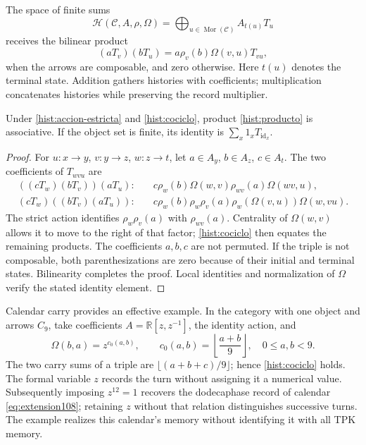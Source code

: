 The space of finite sums
\[
 \mathcal H(\mathcal C,A,\rho,\Omega)
   =\bigoplus_{u\in\operatorname{Mor}(\mathcal C)} A_{t(u)}T_u
\]
receives the bilinear product
\begin{equation}
 (aT_v)(bT_u)=a\rho_v(b)\Omega(v,u)T_{vu},
 \label{hist:producto}
\end{equation}
when the arrows are composable, and zero otherwise. Here \(t(u)\)
denotes the terminal state. Addition gathers histories with coefficients;
multiplication concatenates histories while preserving the record multiplier.

\begin{proposition}
Under \eqref{hist:accion-estricta} and \eqref{hist:cociclo}, product
\eqref{hist:producto} is associative. If the object set is finite,
its identity is \(\sum_x1_xT_{\operatorname{id}_x}\).
\end{proposition}
\begin{proof}
For \(u:x\to y\), \(v:y\to z\), \(w:z\to t\), let
\(a\in A_y\), \(b\in A_z\), \(c\in A_t\). The two coefficients
of \(T_{wvu}\) are
\begin{align*}
 ((cT_w)(bT_v))(aT_u):\quad&
 c\rho_w(b)\Omega(w,v)\rho_{wv}(a)\Omega(wv,u),\\
 (cT_w)((bT_v)(aT_u)):\quad&
 c\rho_w(b)\rho_w\rho_v(a)\rho_w(\Omega(v,u))\Omega(w,vu).
\end{align*}
The strict action identifies \(\rho_w\rho_v(a)\) with \(\rho_{wv}(a)\).
Centrality of \(\Omega(w,v)\) allows it to move to the right of
that factor; \eqref{hist:cociclo} then equates the remaining products.
The coefficients \(a,b,c\) are not permuted. If the triple is not
composable, both parenthesizations are zero because of their initial
and terminal states. Bilinearity completes the proof. Local identities
and normalization of \(\Omega\) verify the stated identity element.
\end{proof}

Calendar carry provides an effective example. In the category with one
object and arrows \(C_9\), take coefficients
\(A=\mathbb R[z,z^{-1}]\), the identity action, and
\[
 \Omega(b,a)=z^{c_0(a,b)},\qquad
 c_0(a,b)=\left\lfloor\frac{a+b}{9}\right\rfloor,
 \quad 0\leq a,b<9.
\]
The two carry sums of a triple are
\(\lfloor(a+b+c)/9\rfloor\); hence \eqref{hist:cociclo} holds.
The formal variable \(z\) records the turn without assigning it a
numerical value. Subsequently imposing \(z^{12}=1\) recovers the
dodecaphase record of calendar \eqref{eq:extension108}; retaining
\(z\) without that relation distinguishes successive turns. The example
realizes this calendar's memory without identifying it with all TPK memory.

